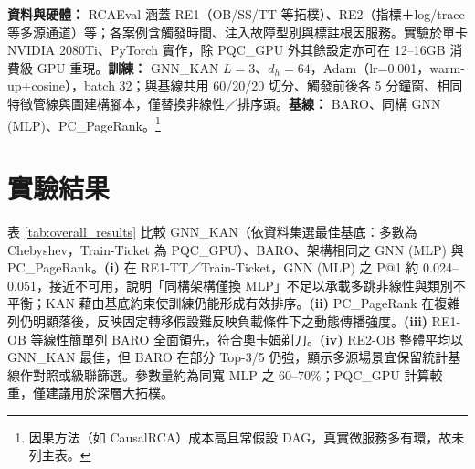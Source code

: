 \documentclass[conference]{IEEEtran}
\begin{document}
\textbf{資料與硬體：} RCAEval \cite{rcaeval2024} 涵蓋 RE1（OB/SS/TT 等拓樸）、RE2（指標＋log/trace 等多源通道）等；各案例含觸發時間、注入故障型別與標註根因服務。實驗於單卡 NVIDIA 2080Ti、PyTorch 實作，除 PQC\_GPU 外其餘設定亦可在 12--16GB 消費級 GPU 重現。\textbf{訓練：} GNN\_KAN $L{=}3$、$d_h{=}64$，Adam（lr=0.001，warm-up+cosine），batch 32；與基線共用 60/20/20 切分、觸發前後各 5 分鐘窗、相同特徵管線與圖建構腳本，僅替換非線性／排序頭。\textbf{基線：} BARO、同構 GNN (MLP)、PC\_PageRank。\footnote{因果方法（如 CausalRCA）成本高且常假設 DAG，真實微服務多有環，故未列主表。}

\section{實驗結果}

表 \ref{tab:overall_results} 比較 GNN\_KAN（依資料集選最佳基底：多數為 Chebyshev，Train-Ticket 為 PQC\_GPU）、BARO、架構相同之 GNN (MLP) 與 PC\_PageRank。\textbf{(i)} 在 RE1-TT／Train-Ticket，GNN (MLP) 之 P@1 約 0.024--0.051，接近不可用，說明「同構架構僅換 MLP」不足以承載多跳非線性與類別不平衡；KAN 藉由基底約束使訓練仍能形成有效排序。\textbf{(ii)} PC\_PageRank 在複雜列仍明顯落後，反映固定轉移假設難反映負載條件下之動態傳播強度。\textbf{(iii)} RE1-OB 等線性簡單列 BARO 全面領先，符合奧卡姆剃刀。\textbf{(iv)} RE2-OB 整體平均以 GNN\_KAN 最佳，但 BARO 在部分 Top-3/5 仍強，顯示多源場景宜保留統計基線作對照或級聯篩選。參數量約為同寬 MLP 之 60--70\%；PQC\_GPU 計算較重，僅建議用於深層大拓樸。
\end{document}
